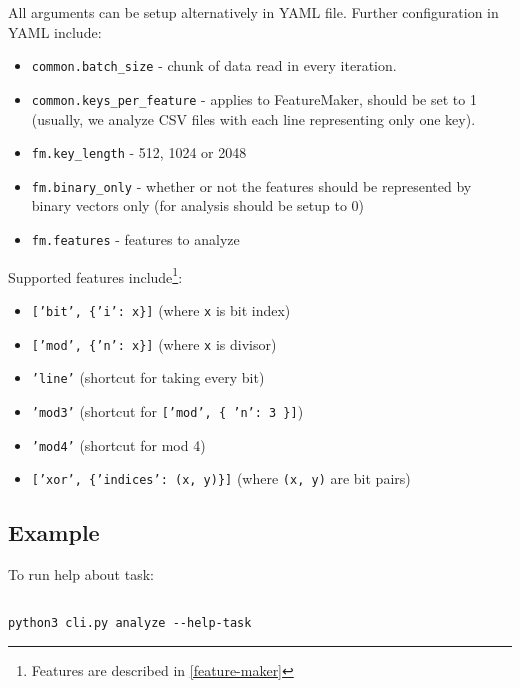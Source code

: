\noindent
All arguments can be setup alternatively in YAML file. Further configuration in YAML include:

\begin{itemize}

\item \texttt{common.batch\_size} - chunk of data read in every iteration.
\item \texttt{common.keys\_per\_feature} - applies to FeatureMaker, should be set to 1 (usually, we analyze CSV files with each line representing only one key).
\item \texttt{fm.key\_length} - 512, 1024 or 2048
\item \texttt{fm.binary\_only} - whether or not the features should be represented by binary vectors only (for analysis should be setup to 0)
\item \texttt{fm.features} - features to analyze

\end{itemize}

\noindent
Supported features include\footnote{Features are described in \autoref{feature-maker}}:

\begin{itemize}

\item \texttt{['bit', \{'i': x\}]} (where \texttt{x} is bit index)
\item \texttt{['mod', \{'n': x\}]} (where \texttt{x} is divisor)
\item \texttt{'line'} (shortcut for taking every bit) 
\item \texttt{'mod3'} (shortcut for \texttt{['mod', \{ 'n': 3 \}]})
\item \texttt{'mod4'} (shortcut for mod 4)
\item \texttt{['xor', \{'indices': (x, y)\}]} (where \texttt{(x, y)} are bit pairs)

\end{itemize}

\subsection*{Example}

To run help about task:

\begin{verbatim}

python3 cli.py analyze --help-task

\end{verbatim}

